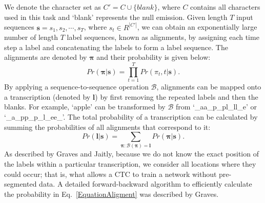 \documentclass[10pt,conference,a4paper]{IEEEtran}
\begin{document}
We denote the character set as $C'=C \cup \{blank\}$, where $C$ contains all characters used in this task and `blank' represents the null emission.
Given length $T$ input sequences $\bm{s}=s_1,s_2,\cdots,s_T$, where $s_t \in R^{|C'|}$, we can obtain an exponentially large number of length $T$ label sequences, known as alignments, by assigning each time step a label and concatenating the labels to form a label sequence.
The alignments are denoted by $\bm{\pi}$ and their probability is given below:
\begin{equation}
    Pr(\bm{\pi}|\bm{s}) = \prod_{t=1}^T Pr(\pi_t,t|\bm{s}).
\end{equation}
By applying a sequence-to-sequence operation $\mathscr{B}$, alignments can be mapped onto a transcription (denoted by $\bm{l}$) by first removing the repeated labels and then the blanks. For example, `apple' can be transformed by $\mathscr{B}$ from `\_aa\_p\_pl\_ll\_e' or `\_a\_pp\_p\_l\_ee\_'. The total probability of a transcription can be calculated by summing the probabilities of all alignments that correspond to it:
\begin{equation}
\label{EquationAligment}
    Pr(\bm{l}|\bm{s}) = \sum_{\bm{\pi}:\mathscr{B}(\bm{\pi})=\bm{l}} Pr(\bm{\pi}|\bm{s}).
\end{equation}
As described by Graves and Jaitly\cite{graves2014towards}, because we do not know the exact position of the labels within a particular transcription, we consider all locations where they could occur;
that is, what allows a CTC to train a network without pre-segmented data.
A detailed forward-backward algorithm to efficiently calculate the probability in Eq.~\eqref{EquationAligment} was described by Graves\cite{graves2012supervised}.
\end{document}
